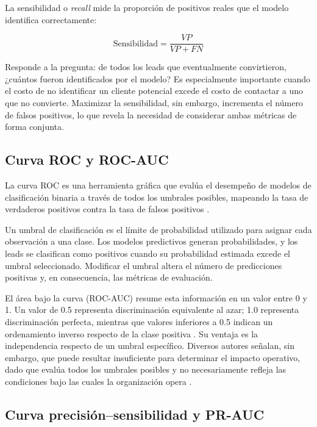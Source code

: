 La sensibilidad o \emph{recall} mide la proporción de positivos reales que el
modelo identifica correctamente:

\begin{equation}
\text{Sensibilidad} = \frac{VP}{VP + FN}
\end{equation}

Responde a la pregunta: de todos los leads que eventualmente convirtieron,
¿cuántos fueron identificados por el modelo? Es especialmente importante cuando el
costo de no identificar un cliente potencial excede el costo de contactar a uno que
no convierte. Maximizar la sensibilidad, sin embargo, incrementa el número de
falsos positivos, lo que revela la necesidad de considerar ambas métricas de forma
conjunta.

\subsection{Curva ROC y ROC-AUC}

La curva ROC es una herramienta gráfica que evalúa el desempeño de modelos de
clasificación binaria a través de todos los umbrales posibles, mapeando la tasa de
verdaderos positivos contra la tasa de falsos positivos \cite{fawcett2006introduction}.

Un umbral de clasificación es el límite de probabilidad utilizado para asignar cada
observación a una clase. Los modelos predictivos generan probabilidades, y los
leads se clasifican como positivos cuando su probabilidad estimada excede el umbral
seleccionado. Modificar el umbral altera el número de predicciones positivas y, en
consecuencia, las métricas de evaluación.

El área bajo la curva (ROC-AUC) resume esta información en un valor entre 0 y 1.
Un valor de 0.5 representa discriminación equivalente al azar; 1.0 representa
discriminación perfecta, mientras que valores inferiores a 0.5 indican un
ordenamiento inverso respecto de la clase positiva \cite{hanley1982meaning,
fawcett2006introduction}. Su ventaja es la independencia respecto de un umbral
específico. Diversos autores señalan, sin embargo, que puede resultar insuficiente
para determinar el impacto operativo, dado que evalúa todos los umbrales posibles y
no necesariamente refleja las condiciones bajo las cuales la organización opera
\cite{hand2009measuring, drummond2006cost}.

\subsection{Curva precisión--sensibilidad y PR-AUC}

